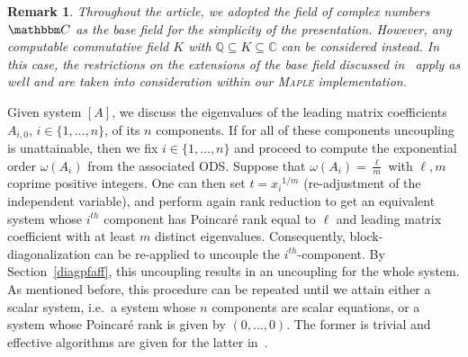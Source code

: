 \documentclass[final,1p,times,number,amsthm]{elsart}
\newtheorem{remark}[lemma]{Remark}
\let\set\mathbbm
\begin{document}
\begin{remark}
  Throughout the article, we adopted the field of complex numbers $\set C$ as
  the base field for the simplicity of the presentation. However, any computable
  commutative field $K$ with $\mathbb{Q} \subseteq K \subseteq \mathbb{C}$ can
  be considered instead. In this case, the restrictions on the extensions of the
  base field discussed in~\cite{key24} apply
  as well and are taken into consideration within our \textsc{Maple}
  implementation.
\end{remark}

Given system $[A]$, we discuss the eigenvalues of the leading matrix coefficients 
$A_{i,0}$, $i \in \{ 1, \dots, n\}$, of its $n$ components. If for all of these
components uncoupling is unattainable, then we fix $i \in \{ 1, \dots, n\}$ and
proceed to compute the exponential order $\omega(A_i)$ from the associated ODS.
Suppose that $\omega(A_i)= \frac{{\ell} }{m}$ with ${\ell} ,m$ coprime positive
integers. One can then set $t = {x_i}^{1/m}$ (re-adjustment of the independent
variable), and perform again rank reduction to get an equivalent system whose
$i^{th}$ component has Poincar\'e rank equal to ${\ell}$ and leading matrix
coefficient with at least $m$ distinct eigenvalues. Consequently,
block-diagonalization can be re-applied to uncouple the $i^{th}$-component.  By
Section~\ref{diagpfaff}, this uncoupling results in an uncoupling for the
whole system. As mentioned before, this procedure can be repeated until we
attain either a scalar system, i.e.\ a system whose $n$ components are scalar
equations, or a system whose Poincar\'e rank is given by $(0, \dots,0)$. The
former is trivial and effective algorithms are given for the latter
in~\cite[Chapter 3]{key73}. \vspace{1cm}
\end{document}
